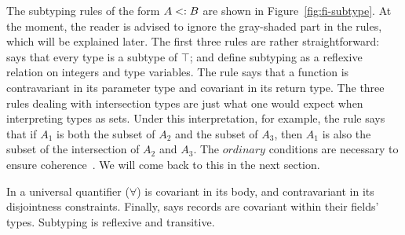 


The subtyping rules of the form $A <: B$ are shown in 
Figure~\ref{fig:fi-subtype}. 
At the moment, the reader is advised to ignore the
gray-shaded part in the rules, which will be explained later. 
The first three rules are rather straightforward: 
says that every type is a subtype of $\top$;  and 
 define subtyping as a reflexive relation on integers and
type variables.
The rule  says that a function is contravariant in 
its parameter type and covariant in its return type. 
The three rules dealing with intersection types are just what one would expect 
when interpreting types as sets. 
Under this interpretation, for example, the rule 
says that if $A_1$ is both the subset of $A_2$ and the subset of $A_3$, then
$A_1$ is also the subset of the intersection of $A_2$ and $A_3$.
The $ordinary$ conditions are necessary to ensure coherence~\cite{icfppaper}.
We will come back to this in the next section.

In  a universal quantifier ($\forall$) 
is covariant in its body, and contravariant in its disjointness constraints.
Finally,  says records are covariant within their fields' types.
Subtyping is reflexive and transitive.

